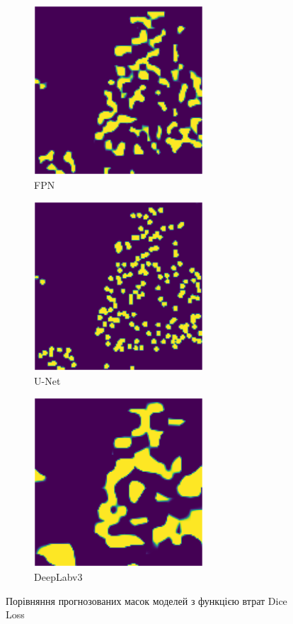 \begin{figure}[ht]
      \centering
      \begin{subfigure}[b]{0.33\textwidth}
            \includegraphics[scale=0.75]{Images/fpn_dice_pred.png}
            \caption{FPN}
      \end{subfigure}%
      \begin{subfigure}[b]{0.33\textwidth}
            \includegraphics[scale=0.75]{Images/unet_dice_pred.png}
            \caption{U-Net}
      \end{subfigure}
      \begin{subfigure}[b]{0.33\textwidth}
            \includegraphics[scale=0.75]{Images/deeplab_dice_pred.png}
            \caption{DeepLabv3}
      \end{subfigure}

      \caption{Порівняння прогнозованих масок моделей з функцією втрат Dice Loss}
      \label{pred_dice_comp}
\end{figure}


